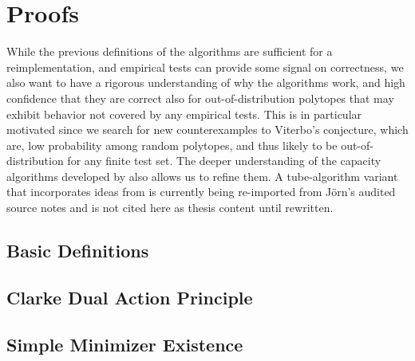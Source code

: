 %
%

\section{Proofs}\label{sec:proofs}

While the previous definitions of the algorithms are sufficient for a reimplementation, and empirical tests can provide some signal on correctness, we also want to have a rigorous understanding of why the algorithms work, and high confidence that they are correct also for out-of-distribution polytopes that may exhibit behavior not covered by any empirical tests. This is in particular motivated since we search for new counterexamples to Viterbo's conjecture, which are, %
low probability among random polytopes, and thus likely to be out-of-distribution for any finite test set.
The deeper understanding of the capacity algorithms developed by \cite{HK2017}
also allows us to refine them. A tube-algorithm variant that incorporates ideas
from \cite{CH2021} is currently being re-imported from Jörn's audited source
notes and is not cited here as thesis content until rewritten.

\subsection{Basic Definitions}\label{subsec:basic-definitions}


\subsection{Clarke Dual Action Principle}\label{subsec:clarkedual-action-principle}


\subsection{Simple Minimizer Existence}\label{subsec:simple-minimizer-existence}


